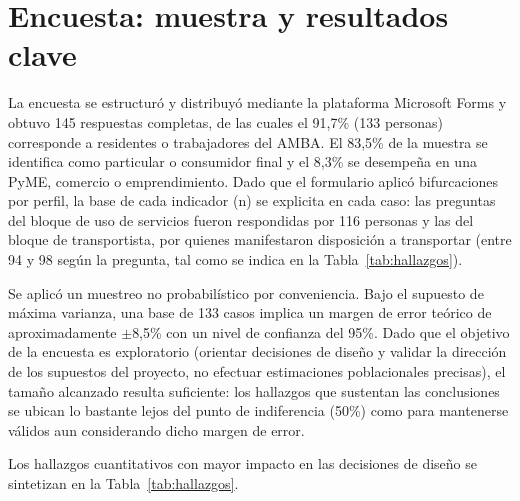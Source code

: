 \section{Encuesta: muestra y resultados clave}

La encuesta se estructuró y distribuyó mediante la plataforma Microsoft Forms y obtuvo 145 respuestas completas, de las cuales el 91,7\% (133 personas) corresponde a residentes o trabajadores del AMBA. El 83,5\% de la muestra se identifica como particular o consumidor final y el 8,3\% se desempeña en una PyME, comercio o emprendimiento. Dado que el formulario aplicó bifurcaciones por perfil, la base de cada indicador (n) se explicita en cada caso: las preguntas del bloque de uso de servicios fueron respondidas por 116 personas y las del bloque de transportista, por quienes manifestaron disposición a transportar (entre 94 y 98 según la pregunta, tal como se indica en la Tabla~\ref{tab:hallazgos}).

Se aplicó un muestreo no probabilístico por conveniencia. Bajo el supuesto de máxima varianza, una base de 133 casos implica un margen de error teórico de aproximadamente $\pm$8,5\% con un nivel de confianza del 95\%. Dado que el objetivo de la encuesta es exploratorio (orientar decisiones de diseño y validar la dirección de los supuestos del proyecto, no efectuar estimaciones poblacionales precisas), el tamaño alcanzado resulta suficiente: los hallazgos que sustentan las conclusiones se ubican lo bastante lejos del punto de indiferencia (50\%) como para mantenerse válidos aun considerando dicho margen de error.

Los hallazgos cuantitativos con mayor impacto en las decisiones de diseño se sintetizan en la Tabla~\ref{tab:hallazgos}.

